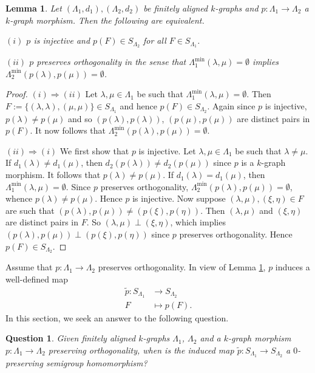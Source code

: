 \documentclass[a4paper,reqno,11pt]{amsart}
\numberwithin{equation}{section}
\newtheorem{lem}[thm]{Lemma}
\newtheorem{ques}[thm]{Question}
\theoremstyle{definition}
\theoremstyle{remark}
\begin{document}
\begin{lem}\label{lem induced elements}
Let $(\Lambda_1,d_1),(\Lambda_2,d_2)$ be finitely aligned $k$-graphs and $p:\Lambda_1\longrightarrow \Lambda_2$ a $k$-graph morphism. Then the following are equivalent.

$(i)$ $p$ is injective and $p(F)\in S_{\Lambda_2}$ for all $F\in S_{\Lambda_1}$.

$(ii)$ $p$ preserves orthogonality in the sense that $\Lambda_1^{\min}(\lambda,\mu)=\emptyset$ implies $\Lambda_2^{\min}(p(\lambda),p(\mu))=\emptyset$.
\end{lem}
\begin{proof}
$(i)\Rightarrow (ii)$ Let $\lambda,\mu\in \Lambda_1$ be such that $\Lambda_1^{\min}(\lambda,\mu)=\emptyset$. Then $F:=\{(\lambda,\lambda),(\mu,\mu)\}\in S_{\Lambda_1}$ and hence $p(F)\in S_{\Lambda_2}$. Again since $p$ is injective, $p(\lambda)\neq p(\mu)$ and so $(p(\lambda),p(\lambda))$, $(p(\mu),p(\mu))$ are distinct pairs in $p(F)$. It now follows that $\Lambda_2^{\min}(p(\lambda),p(\mu))=\emptyset$. 

$(ii)\Rightarrow (i)$ We first show that $p$ is injective. Let $\lambda,\mu\in \Lambda_1$ be such that $\lambda\neq \mu$. If $d_1(\lambda)\neq d_1(\mu)$, then $d_2(p(\lambda))\neq d_2(p(\mu))$ since $p$ is a $k$-graph morphism. It follows that $p(\lambda)\neq p(\mu)$. If $d_1(\lambda)=d_1(\mu)$, then $\Lambda_1^{\min}(\lambda,\mu)=\emptyset$. Since $p$ preserves orthogonality, $\Lambda_2^{\min}(p(\lambda),p(\mu))=\emptyset$, whence $p(\lambda)\neq p(\mu)$. Hence $p$ is injective. Now suppose $(\lambda,\mu),(\xi,\eta)\in F$ are such that $(p(\lambda),p(\mu))\neq (p(\xi),p(\eta))$. Then $(\lambda,\mu)$ and $(\xi,\eta)$ are distinct pairs in $F$. So $(\lambda,\mu)\perp (\xi,\eta)$, which implies $(p(\lambda),p(\mu))\perp (p(\xi),p(\eta))$ since $p$ preserves orthogonality. Hence $p(F)\in S_{\Lambda_2}$. 
\end{proof} 
Assume that $p:\Lambda_1\longrightarrow \Lambda_2$ preserves orthogonality. In view of Lemma \ref{lem induced elements}, $p$ induces a well-defined map 
\begin{align*}
\tilde{p}:S_{\Lambda_1} &\longrightarrow S_{\Lambda_2}\\
F &\longmapsto p(F).
\end{align*}
In this section, we seek an answer to the following question.
\begin{ques}\label{query k-graph morphism inducing semigroup morphism}
Given finitely aligned $k$-graphs $\Lambda_1$, $\Lambda_2$ and a $k$-graph morphism $p:\Lambda_1\longrightarrow \Lambda_2$ preserving orthogonality, when is the induced map $\tilde{p}:S_{\Lambda_1} \longrightarrow S_{\Lambda_2}$ a $0$-preserving semigroup homomorphism?     
\end{ques}
\end{document}
